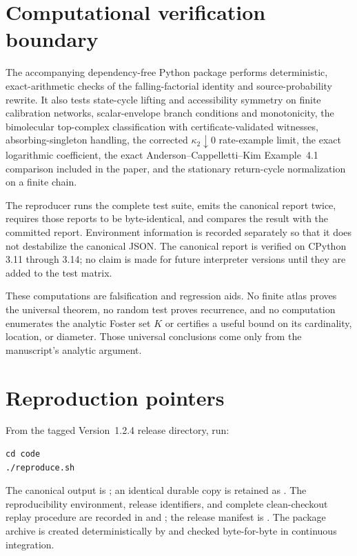 \documentclass[10pt]{article}
\begin{document}
\section{Computational verification boundary}

The accompanying dependency-free Python package performs deterministic,
exact-arithmetic checks of the falling-factorial identity and
source-probability rewrite.  It also tests state-cycle lifting and accessibility
symmetry on finite calibration networks, scalar-envelope branch conditions and
monotonicity, the bimolecular top-complex classification with
certificate-validated witnesses, absorbing-singleton handling, the corrected
$\kappa_2\downarrow0$ rate-example limit, the exact logarithmic coefficient,
the exact Anderson--Cappelletti--Kim Example~4.1 comparison included in the
paper, and the stationary return-cycle normalization on a finite chain.

The reproducer runs the complete test suite, emits the canonical report twice,
requires those reports to be byte-identical, and compares the result with the
committed report.  Environment information is recorded separately so that it
does not destabilize the canonical JSON.  The canonical report is verified on
CPython 3.11 through 3.14; no claim is made for future interpreter versions
until they are added to the test matrix.

These computations are falsification and regression aids.  No finite atlas
proves the universal theorem, no random test proves recurrence, and no
computation enumerates the analytic Foster set $K$ or certifies a useful bound
on its cardinality, location, or diameter.  Those universal conclusions come
only from the manuscript's analytic argument.

\section{Reproduction pointers}

From the tagged Version~1.2.4 release directory, run:

\begin{verbatim}
cd code
./reproduce.sh
\end{verbatim}

The canonical output is
; an identical durable copy is retained
as .  The reproducibility environment,
release identifiers, and complete clean-checkout replay procedure are recorded
in  and ; the release manifest is
.  The package archive is created
deterministically by  and checked
byte-for-byte in continuous integration.
\end{document}
